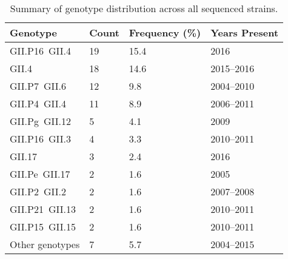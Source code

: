 \begin{table}[htbp]
	\centering
	\caption{Summary of genotype distribution across all sequenced strains.}
	\scriptsize
	\begin{tabular}{p{3.0cm}p{1.5cm}p{1.5cm}p{2.0cm}}
		\toprule
		\textbf{Genotype} & \textbf{Count} & \textbf{Frequency (\%)} & \textbf{Years Present} \\
		\midrule
		GII.P16~GII.4     & 19             & 15.4                    & 2016                   \\
		GII.4             & 18             & 14.6                    & 2015--2016             \\
		GII.P7~GII.6      & 12             & 9.8                     & 2004--2010             \\
		GII.P4~GII.4      & 11             & 8.9                     & 2006--2011             \\
		GII.Pg~GII.12     & 5              & 4.1                     & 2009                   \\
		GII.P16~GII.3     & 4              & 3.3                     & 2010--2011             \\
		GII.17            & 3              & 2.4                     & 2016                   \\
		GII.Pe~GII.17     & 2              & 1.6                     & 2005                   \\
		GII.P2~GII.2      & 2              & 1.6                     & 2007--2008             \\
		GII.P21~GII.13    & 2              & 1.6                     & 2010--2011             \\
		GII.P15~GII.15    & 2              & 1.6                     & 2010--2011             \\
		Other genotypes   & 7              & 5.7                     & 2004--2015             \\
		\bottomrule
	\end{tabular}
	\label{tab:genotype_summary}
\end{table}
